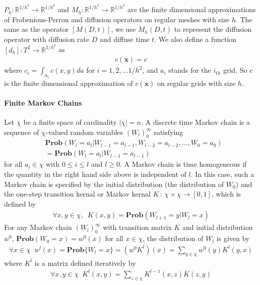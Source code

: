 \documentclass{article}
\begin{document}
$P_h: \mathbb{R}^{1/h^2} \rightarrow \mathbb{R}^{1/h^2} $ and $M_h:
\mathbb{R}^{1/h^2} \rightarrow \mathbb{R}^{1/h^2}$ are the finite
dimensional approximations of Frobenious-Perron and diffusion
operators on regular meshes with size $h$. The same as the operator
$[M(D,t)]$, we use $M_h(D,t)$ to represent the diffusion operator
with diffusion rate $D$ and diffuse time $t$. We also define a
function $[d_h]: T^2 \rightarrow \mathbb{R}^{1/h^2}$ as
\begin{eqnarray}
[d_h]c(\mathbf{x}) = c
\end{eqnarray}
where $c_i = \int_{a_i} c(x,y) da$ for $i = 1,2,...1/h^2$, and $a_i$
stands for the $i_{th}$ grid. So $c$ is the finite dimensional
approximation of $c(\mathbf{x})$ on regular grids with size $h$.


\paragraph{Finite Markov Chains}
Let $\chi$ be a finite space of cardinality $|\chi|=n$. A discrete
time Markov chain is a sequence of $\chi$-valued random variables
$(W_l)_0^{\infty}$ satisfying
\begin{eqnarray*}
 &\mathbf{Prob}(W_l = a_l | W_{l-1} = a_{l-1},W_{l-2} = a_{l-2},...,W_0 = a_0)  \\
 &=\mathbf{Prob}(W_{l} = a_l | W_{l-1} = a_{l-1})
\end{eqnarray*}
for all $a_i \in \chi$ with $0 \le i \le l$ and $l\ge 0$. A Markov
chain is time homogeneous if the quantity in the right hand side
above is independent of $l$. In this case, such a Markov chain is
specified by the initial distribution (the distribution of $W_0$)
and the one-step transition kernal or Markov kernal $K\,:\, \chi
\times \chi \rightarrow [0,1]$, which is defined by
\begin{eqnarray*}
\forall x,y \in \chi, \,\,\, K(x,y)=\mathbf{Prob}(W_{l+1} = y |
W_{l} = x)
\end{eqnarray*}
For any Markov chain $(W_l)_0^{\infty}$ with transition matrix $K$
and initial distribution $w^0$,  $\mathbf{Prob}(W_0=x)=w^0(x)$ for
all $x \in \chi$, the distribution of $W_l$ is given by
\begin{eqnarray}
\label{Kevolvedistribution} \forall x\in \chi \,\,\, w^l(x) =
\mathbf{Prob}\{W_l=x\}=(w^0 K^l)(x)=\sum_{y\in \chi} w^0(y)K^l(y,x)
\end{eqnarray}
where $K^l$ is a matrix defined iteratively by
\begin{eqnarray*}
\forall x,y \in \chi \,\,\, K^l(x,y)=\sum_{z \in
\chi}K^{l-1}(x,z)K(z,y)
\end{eqnarray*}
\end{document}

